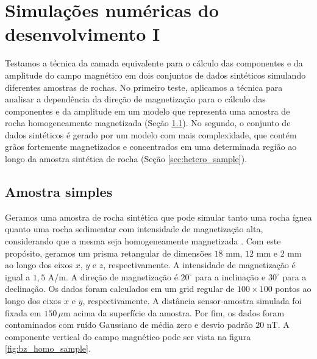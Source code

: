 \chapter{Simulações numéricas do desenvolvimento I}
\label{chap:synt_tests_II}

Testamos a técnica da camada equivalente para o cálculo das componentes e da amplitude do campo magnético em dois conjuntos de dados sintéticos simulando diferentes amostras de rochas. No primeiro teste, aplicamos a técnica para analisar a dependência da direção de magnetização para o cálculo das componentes e da amplitude em um modelo que representa uma amostra de rocha homogeneamente magnetizada (Seção \ref{sec:simple_sample}). No segundo, o conjunto de dados sintéticos é gerado por um modelo com mais complexidade, que contém grãos fortemente magnetizados e concentrados em uma determinada região ao longo da amostra sintética de rocha (Seção \ref{sec:hetero_sample}). 

\section{Amostra simples}
\label{sec:simple_sample}

Geramos uma amostra de rocha sintética que pode simular tanto uma rocha ígnea quanto uma rocha sedimentar com intensidade de magnetização alta, considerando que a mesma seja homogeneamente magnetizada \citep{collinson1983,dunlop1997}. Com este propósito, geramos um prisma retangular de dimensões $18$ mm, $12$ mm e $2$ mm ao longo dos eixos $x$, $y$ e $z$, respectivamente. A intensidade de magnetização é igual a $1,5$ A/m. A direção de magnetização é $20^\circ$ para a inclinação e $30^\circ$ para a declinação. Os dados foram calculados em um grid regular de $100 \times 100$ pontos ao longo dos eixos $x$ e $y$, respectivamente. A distância sensor-amostra simulada foi fixada em $150 \, \mu $m acima da superfície da amostra. Por fim, os dados foram contaminados com ruído Gaussiano de média zero e desvio padrão $20$ nT. A componente vertical do campo magnético pode ser vista na figura \ref{fig:bz_homo_sample}.       

